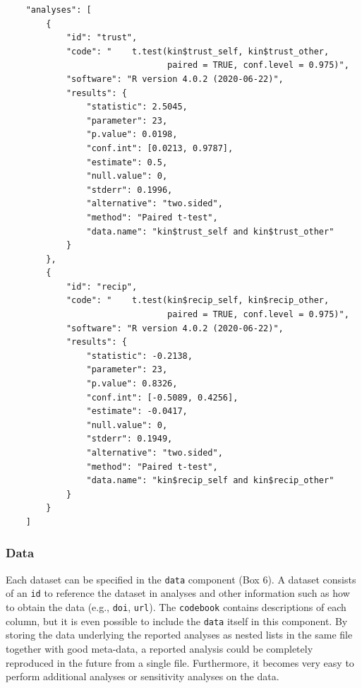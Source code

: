\documentclass[
  english,
  doc,floatsintext]{apa6}
\begin{document}
\begin{tcolorbox}[colback=black!5!white,colframe=white!5!black,title=Box 5a. The analysis component.]
\begin{verbatim}
    "analyses": [
        {
            "id": "trust",
            "code": "    t.test(kin$trust_self, kin$trust_other, 
                                paired = TRUE, conf.level = 0.975)",
            "software": "R version 4.0.2 (2020-06-22)",
            "results": {
                "statistic": 2.5045,
                "parameter": 23,
                "p.value": 0.0198,
                "conf.int": [0.0213, 0.9787],
                "estimate": 0.5,
                "null.value": 0,
                "stderr": 0.1996,
                "alternative": "two.sided",
                "method": "Paired t-test",
                "data.name": "kin$trust_self and kin$trust_other"
            }
        },
        {
            "id": "recip",
            "code": "    t.test(kin$recip_self, kin$recip_other, 
                                paired = TRUE, conf.level = 0.975)",
            "software": "R version 4.0.2 (2020-06-22)",
            "results": {
                "statistic": -0.2138,
                "parameter": 23,
                "p.value": 0.8326,
                "conf.int": [-0.5089, 0.4256],
                "estimate": -0.0417,
                "null.value": 0,
                "stderr": 0.1949,
                "alternative": "two.sided",
                "method": "Paired t-test",
                "data.name": "kin$recip_self and kin$recip_other"
            }
        }
    ]
\end{verbatim}
\end{tcolorbox}

\hypertarget{data}{%
\subsubsection{Data}\label{data}}

Each dataset can be specified in the \texttt{data} component (Box 6). A dataset consists of an \texttt{id} to reference the dataset in analyses and other information such as how to obtain the data (e.g., \texttt{doi}, \texttt{url}). The \texttt{codebook} contains descriptions of each column, but it is even possible to include the \texttt{data} itself in this component. By storing the data underlying the reported analyses as nested lists in the same file together with good meta-data, a reported analysis could be completely reproduced in the future from a single file. Furthermore, it becomes very easy to perform additional analyses or sensitivity analyses on the data.
\end{document}
